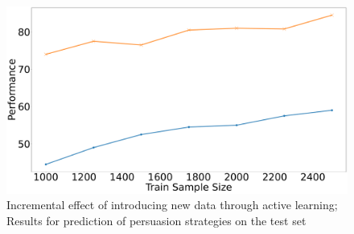 \begin{table}[!t]
        \small
        \centering

        \caption{\small Comparison of caption and object detection models. We noticed that BLIP while being more recent and trained on a larger dataset, generates more informatory captions for background objects which DenseCap successfully ignores.}
        \label{tab:varying_cap_obj}
    \end{table}
        \begin{figure}[h]
        \centering
        \includegraphics[scale=0.12]{images/active_learning.pdf}
        \caption{\small Incremental effect of introducing new data through active learning; Results for prediction of persuasion strategies on the test set}
        \label{fig:AL_batch_test}
    \end{figure}


